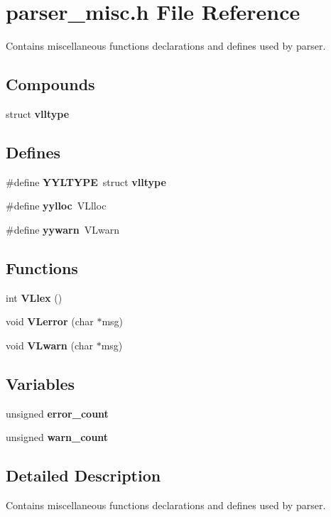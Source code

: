 \section{parser\_\-misc.h File Reference}
\label{parser__misc_8h}
Contains miscellaneous functions declarations and defines used by parser. 


\subsection*{Compounds}
\begin{CompactItemize}
\item 
struct {\bf vlltype}
\end{CompactItemize}
\subsection*{Defines}
\begin{CompactItemize}
\item 
\#define {\bf YYLTYPE}\ struct {\bf vlltype}
\item 
\#define {\bf yylloc}\ VLlloc
\item 
\#define {\bf yywarn}\ VLwarn
\end{CompactItemize}
\subsection*{Functions}
\begin{CompactItemize}
\item 
int {\bf VLlex} ()
\item 
void {\bf VLerror} (char $\ast$msg)
\item 
void {\bf VLwarn} (char $\ast$msg)
\end{CompactItemize}
\subsection*{Variables}
\begin{CompactItemize}
\item 
unsigned {\bf error\_\-count}
\item 
unsigned {\bf warn\_\-count}
\end{CompactItemize}


\subsection{Detailed Description}
Contains miscellaneous functions declarations and defines used by parser.



